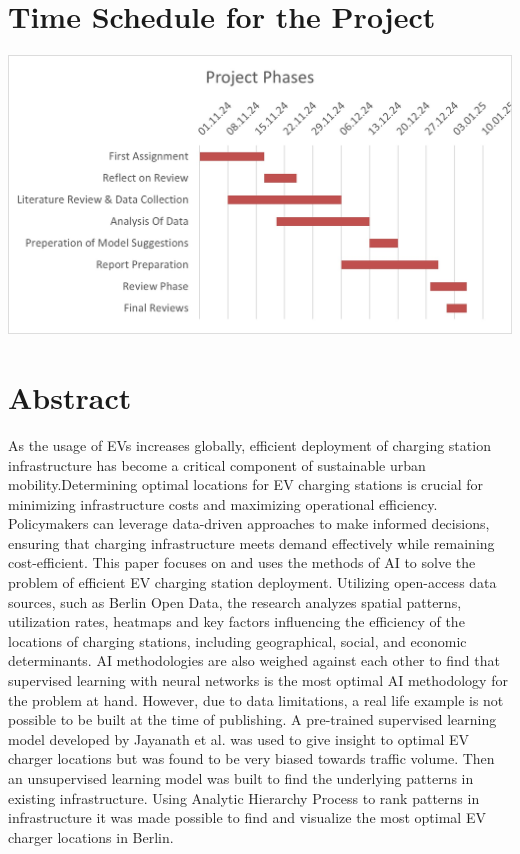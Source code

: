 \newpage

\section{Time Schedule for the Project}
\begin{center}
    \includegraphics[width=\linewidth]{Bilder/gannt1.jpg}
\end{center}

\section{Abstract}
As the usage of EVs increases globally, efficient deployment of charging station infrastructure has become a critical component of sustainable urban mobility.Determining optimal locations for EV charging stations is crucial for minimizing infrastructure costs and maximizing operational efficiency. Policymakers can leverage data-driven approaches to make informed decisions, ensuring that charging infrastructure meets demand effectively while remaining cost-efficient. This paper focuses on and uses the methods of AI to solve the problem of efficient EV charging station deployment. Utilizing open-access data sources, such as Berlin Open Data, the research analyzes spatial patterns, utilization rates, heatmaps and key factors influencing the efficiency of the locations of charging stations, including geographical, social, and economic determinants. AI methodologies are also weighed against each other to find that supervised learning with neural networks is the most optimal AI methodology for the problem at hand. However, due to data limitations, a real life example is not possible to be built at the time of publishing. A pre-trained supervised learning model developed by Jayanath et al.\cite{Jayanath2024} was used to give insight to optimal EV charger locations but was found to be very biased towards traffic volume. Then an unsupervised learning model was built to find the underlying patterns in existing infrastructure. Using Analytic Hierarchy Process to rank patterns in infrastructure it was made possible to find and visualize the most optimal EV charger locations in Berlin.

